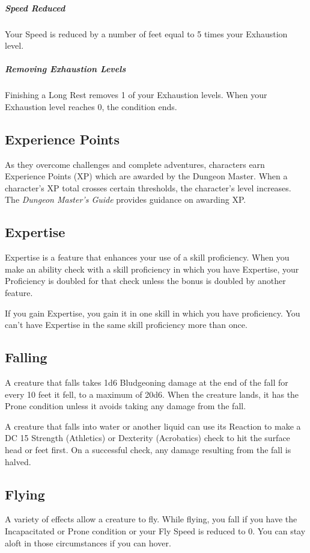 \documentclass[10pt,a4paper,twoside,bg=print,twocolumn,openany,nodeprecatedcode]{dndarticle}
\begin{document}
\subparagraph{Speed Reduced}
Your Speed is reduced by a number of feet equal to 5 times your Exhaustion level.

\subparagraph{Removing Exhaustion Levels}
Finishing a Long Rest removes 1 of your Exhaustion levels. When your Exhaustion level reaches 0, the condition ends.

\subsection{Experience Points}
As they overcome challenges and complete adventures, characters earn Experience Points (XP) which are awarded by the Dungeon Master. When a character's XP total crosses certain thresholds, the character's level increases. The \textit{Dungeon Master's Guide} provides guidance on awarding XP.

\subsection{Expertise}
Expertise is a feature that enhances your use of a skill proficiency. When you make an ability check with a skill proficiency in which you have Expertise, your Proficiency is doubled for that check unless the bonus is doubled by another feature.

If you gain Expertise, you gain it in one skill in which you have proficiency. You can't have Expertise in the same skill proficiency more than once.

\subsection{Falling}
A creature that falls takes 1d6 Bludgeoning damage at the end of the fall for every 10 feet it fell, to a maximum of 20d6. When the creature lands, it has the Prone condition unless it avoids taking any damage from the fall.

A creature that falls into water or another liquid can use its Reaction to make a DC 15 Strength (Athletics) or Dexterity (Acrobatics) check to hit the surface head or feet first. On a successful check, any damage resulting from the fall is halved.

\subsection{Flying}
A variety of effects allow a creature to fly. While flying, you fall if you have the Incapacitated or Prone condition or your Fly Speed is reduced to 0. You can stay aloft in those circumstances if you can hover.
\end{document}
